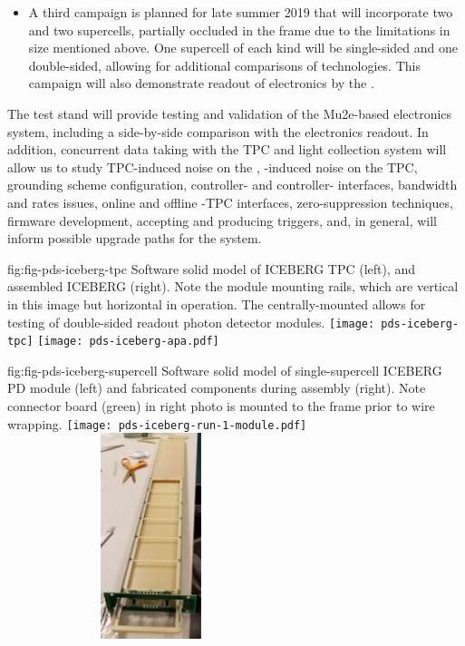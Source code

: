 \begin{itemize}
    \item A third campaign is planned for late summer 2019 that will incorporate two  and two  supercells, partially occluded in the frame due to the limitations in  size mentioned above.  One supercell of each kind will be single-sided and one double-sided, allowing for additional comparisons of  technologies.  This campaign will also demonstrate readout of  electronics by the  .
    
\end{itemize}

The test stand will provide testing and validation of the  Mu2e-based electronics system, including a side-by-side comparison with the   electronics readout. In addition, concurrent data taking with the TPC and light collection system will allow us to study TPC-induced noise on the , -induced noise on the TPC, grounding scheme configuration, controller- and controller- interfaces, bandwidth and rates issues, online and offline -TPC interfaces, zero-suppression techniques, firmware development, accepting and producing triggers, and, in general, will inform possible upgrade paths for the system. 


\begin{dunefigure}
 {fig:fig-pds-iceberg-tpc}
 {Software solid model of ICEBERG TPC (left), and assembled ICEBERG  (right).  Note the  module mounting rails, which are vertical in this image but horizontal in operation. The centrally-mounted  allows for testing of double-sided readout photon detector modules.}
\texttt{[image: pds-iceberg-tpc]}
\texttt{[image: pds-iceberg-apa.pdf]}
\end{dunefigure}

\begin{dunefigure}
 {fig:fig-pds-iceberg-supercell}
 {Software solid model of single-supercell ICEBERG PD module (left) and fabricated components during assembly (right).  Note connector board (green) in right photo is mounted to the  frame prior to wire wrapping.}
\texttt{[image: pds-iceberg-run-1-module.pdf]}
\includegraphics[angle=0,width=8.4cm,height=6cm]{graphics/pds-iceberg-module-assembly-photo.pdf}
\end{dunefigure}

